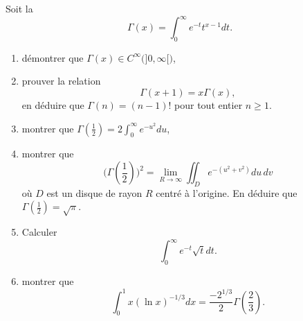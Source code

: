 

\begin{exercice}\label{exo_I-3-10}

Soit la 
\begin{equation}
	\Gamma(x)=\int_0^{\infty} e^{-t}t^{x-1}dt.
\end{equation}
\begin{enumerate}
\item démontrer que $\Gamma(x)\in C^{\infty}\big( ]0,\infty[ \big)$,
\item prouver la relation
\begin{equation}		\label{EqGammaFacto}
	\Gamma(x+1)=x\Gamma(x),
\end{equation}
en déduire que  $\Gamma(n)=(n-1)!$ pour tout entier $n\geq 1$.

\item montrer que $\Gamma(\frac{1 }{2})=2\int_0^{\infty} e^{-u^2}du$,
\item montrer que 
\begin{equation}
	\big( \Gamma(\frac{ 1 }{2}) \big)^2=\lim_{R\to\infty}\iint_D e^{-(u^2+v^2)}du\,dv
\end{equation}
où $D$ est un disque de rayon $R$ centré à l'origine. En déduire que $\Gamma(\frac{ 1 }{2})=\sqrt{\pi}$.

\item
Calculer
\begin{equation}
	\int_{0}^{\infty} e^{-t}\sqrt{t}dt.
\end{equation}

\item
montrer que 
\begin{equation}
	\int_0^1x(\ln x)^{-1/3}dx=\frac{ -2^{1/3} }{ 2 }\Gamma(\frac{ 2 }{ 3 }).
\end{equation}

\end{enumerate}


\end{exercice}

